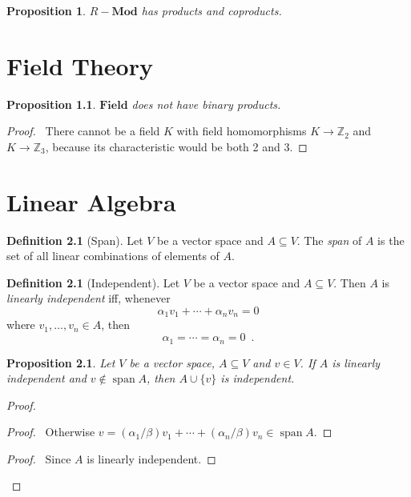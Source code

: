 \documentclass{book}
\let\qed\relax
\newtheorem{prop}[ax]{Proposition}
\theoremstyle{definition}
\newtheorem{df}[ax]{Definition}
\newcommand{\spn}{\ensuremath{\operatorname{span}}}
\begin{document}
\begin{prop}
$R-\mathbf{Mod}$ has products and coproducts.
\end{prop}

\chapter{Field Theory}

\begin{prop}
$\mathbf{Field}$ does not have binary products.
\end{prop}

\begin{proof}
\pf\ There cannot be a field $K$ with field homomorphisms $K \rightarrow \mathbb{Z}_2$ and $K \rightarrow \mathbb{Z}_3$, because its characteristic would be both 2 and 3. \qed
\end{proof}

\chapter{Linear Algebra}

\begin{df}[Span]
Let $V$ be a vector space and $A \subseteq V$. The \emph{span} of $A$ is the set of all linear combinations of elements of $A$.
\end{df}

\begin{df}[Independent]
Let $V$ be a vector space and $A \subseteq V$. Then $A$ is \emph{linearly independent} iff, whenever
\[ \alpha_1 v_1 + \cdots + \alpha_n v_n = 0 \]
where $v_1, \ldots, v_n \in A$, then
\[ \alpha_1 = \cdots = \alpha_n = 0 \enspace . \]
\end{df}

\begin{prop}
\label{prop:extend_linearly_independent}
Let $V$ be a vector space, $A \subseteq V$ and $v \in V$. If $A$ is linearly independent and $v \notin \spn A$, then $A \cup \{ v \}$ is independent.
\end{prop}

\begin{proof}
\pf
{}
\begin{proof}
	\pf\ Otherwise $v = (\alpha_1 / \beta) v_1 + \cdots + (\alpha_n / \beta) v_n \in \spn A$.
\end{proof}
\begin{proof}
	\pf\ Since $A$ is linearly independent.
\end{proof}
\qed
\end{proof}
\end{document}
